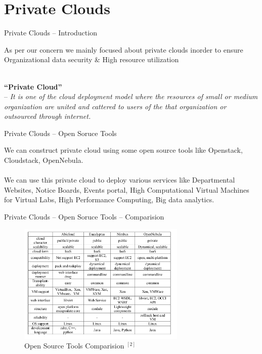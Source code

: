 \documentclass[xcolor=dvipsnames]{beamer}
\begin{document}
\section{Private Clouds}
\begin{frame}{Private Clouds -- Introduction}

As per our concern we mainly focused about private clouds inorder to ensure Organizational data security \& High resource utilization

\hspace{4cm}\\

\textbf{``Private Cloud''} \\ 
\hspace{16mm} -- \textit{It is one of the cloud deployment model where the resources of small or medium organization are united and cattered to users of the that organization or outsourced through internet.} 

\end{frame}

\begin{frame}{Private Clouds -- Open Soruce Tools}

We can construct private cloud using some open source tools like Openstack, Cloudstack, OpenNebula. \\

\hspace{4cm} \\

We can use this private cloud to deploy various services like Departmental Websites, Notice Boards, Events portal, High Computational Virtual Machines for Virtual Labs, High Performance Computing, Big data analytics.

\end{frame}

\begin{frame}{Private Clouds -- Open Soruce Tools -- Comparision}

\begin{figure}[H]
 \centering
 \includegraphics[width=8cm]{./comp.png}
 \caption{Open Source Tools Comparision $ ^{[2]} $\label{fig:Comparision of Open Source Tools}}
\end{figure}

\end{frame}
\end{document}
